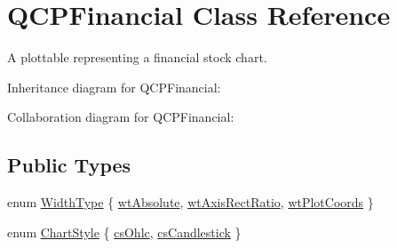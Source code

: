 \hypertarget{classQCPFinancial}{}\section{Q\+C\+P\+Financial Class Reference}
\label{classQCPFinancial}


A plottable representing a financial stock chart.  




Inheritance diagram for Q\+C\+P\+Financial\+:


Collaboration diagram for Q\+C\+P\+Financial\+:
\subsection*{Public Types}
\begin{DoxyCompactItemize}
\item 
enum \hyperlink{classQCPFinancial_aef1761dda71a53dc5269685e9e492626}{Width\+Type} \{ \hyperlink{classQCPFinancial_aef1761dda71a53dc5269685e9e492626a0758d53bb6d7b4858e6bf8771edc934a}{wt\+Absolute}, 
\hyperlink{classQCPFinancial_aef1761dda71a53dc5269685e9e492626a806518350ea5814d28c29b0056e33ecd}{wt\+Axis\+Rect\+Ratio}, 
\hyperlink{classQCPFinancial_aef1761dda71a53dc5269685e9e492626af676bc8dbe700b96b333329c9dbfc30f}{wt\+Plot\+Coords}
 \}
\item 
enum \hyperlink{classQCPFinancial_a0f800e21ee98d646dfc6f8f89d10ebfb}{Chart\+Style} \{ \hyperlink{classQCPFinancial_a0f800e21ee98d646dfc6f8f89d10ebfba3a516016c9298d3e95dd82aa203c4390}{cs\+Ohlc}, 
\hyperlink{classQCPFinancial_a0f800e21ee98d646dfc6f8f89d10ebfbac803cbd39f26e3f206bcc7028679e62f}{cs\+Candlestick}
 \}
\end{DoxyCompactItemize}
